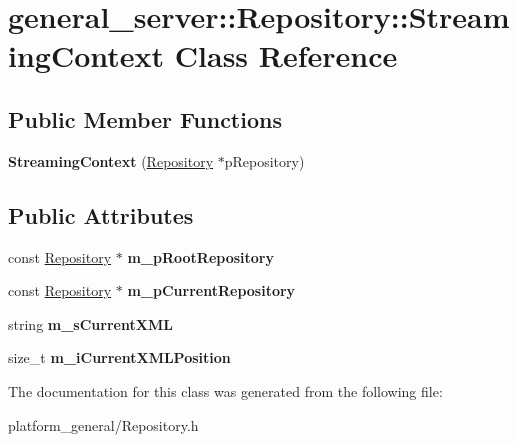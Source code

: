\hypertarget{classgeneral__server_1_1Repository_1_1StreamingContext}{\section{general\-\_\-server\-:\-:\-Repository\-:\-:\-Streaming\-Context \-Class \-Reference}
\label{classgeneral__server_1_1Repository_1_1StreamingContext}
}
\subsection*{\-Public \-Member \-Functions}
\begin{DoxyCompactItemize}
\item 
\hypertarget{classgeneral__server_1_1Repository_1_1StreamingContext_a776075fdfb632b71370286d5cb868174}{{\bfseries \-Streaming\-Context} (\hyperlink{classgeneral__server_1_1Repository}{\-Repository} $\ast$p\-Repository)}\label{classgeneral__server_1_1Repository_1_1StreamingContext_a776075fdfb632b71370286d5cb868174}

\end{DoxyCompactItemize}
\subsection*{\-Public \-Attributes}
\begin{DoxyCompactItemize}
\item 
\hypertarget{classgeneral__server_1_1Repository_1_1StreamingContext_aef451aa0d85ad7f8d30668996512162f}{const \hyperlink{classgeneral__server_1_1Repository}{\-Repository} $\ast$ {\bfseries m\-\_\-p\-Root\-Repository}}\label{classgeneral__server_1_1Repository_1_1StreamingContext_aef451aa0d85ad7f8d30668996512162f}

\item 
\hypertarget{classgeneral__server_1_1Repository_1_1StreamingContext_ab69b624daad2635c37a75007f8f4de6b}{const \hyperlink{classgeneral__server_1_1Repository}{\-Repository} $\ast$ {\bfseries m\-\_\-p\-Current\-Repository}}\label{classgeneral__server_1_1Repository_1_1StreamingContext_ab69b624daad2635c37a75007f8f4de6b}

\item 
\hypertarget{classgeneral__server_1_1Repository_1_1StreamingContext_ac06b69e6f8acc58e4d8ce0524345ec06}{string {\bfseries m\-\_\-s\-Current\-X\-M\-L}}\label{classgeneral__server_1_1Repository_1_1StreamingContext_ac06b69e6f8acc58e4d8ce0524345ec06}

\item 
\hypertarget{classgeneral__server_1_1Repository_1_1StreamingContext_a1e50dfce9f741c0906388c51ed5f50e0}{size\-\_\-t {\bfseries m\-\_\-i\-Current\-X\-M\-L\-Position}}\label{classgeneral__server_1_1Repository_1_1StreamingContext_a1e50dfce9f741c0906388c51ed5f50e0}

\end{DoxyCompactItemize}


\-The documentation for this class was generated from the following file\-:\begin{DoxyCompactItemize}
\item 
platform\-\_\-general/\-Repository.\-h\end{DoxyCompactItemize}
